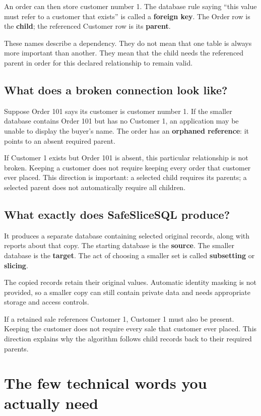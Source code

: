\documentclass[12pt,a4paper,oneside]{report}
\begin{document}
An order can then store customer number 1. The database rule saying ``this value must refer to a customer that exists'' is called a \textbf{foreign key}. The Order row is the \textbf{child}; the referenced Customer row is its \textbf{parent}.

These names describe a dependency. They do not mean that one table is always more important than another. They mean that the child needs the referenced parent in order for this declared relationship to remain valid.

\section{What does a broken connection look like?}
Suppose Order 101 says its customer is customer number 1. If the smaller database contains Order 101 but has no Customer 1, an application may be unable to display the buyer's name. The order has an \textbf{orphaned reference}: it points to an absent required parent.

If Customer 1 exists but Order 101 is absent, this particular relationship is not broken. Keeping a customer does not require keeping every order that customer ever placed. This direction is important: a selected child requires its parents; a selected parent does not automatically require all children.

\section{What exactly does SafeSliceSQL produce?}
It produces a separate database containing selected original records, along with reports about that copy. The starting database is the \textbf{source}. The smaller database is the \textbf{target}. The act of choosing a smaller set is called \textbf{subsetting} or \textbf{slicing}.

The copied records retain their original values. Automatic identity masking is not provided, so a smaller copy can still contain private data and needs appropriate storage and access controls.

If a retained sale references Customer 1, Customer 1 must also be present. Keeping the customer does not require every sale that customer ever placed. This direction explains why the algorithm follows child records back to their required parents.

\chapter{The few technical words you actually need}
\end{document}
